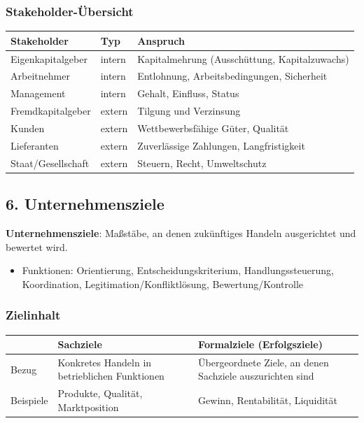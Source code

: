 \documentclass[11pt, a4paper]{article}
\begin{document}
\subsubsection{Stakeholder-Übersicht}


{\small
\begin{tabularx}{\linewidth}{XXX}
\hline
\rowcolor{tableheadbg}
{\color{white}\textbf{Stakeholder}} & {\color{white}\textbf{Typ}} & {\color{white}\textbf{Anspruch}} \\[2pt]
\hline
\endhead
\hline
\endfoot
Eigenkapitalgeber & intern & Kapitalmehrung (Ausschüttung, Kapitalzuwachs) \\
Arbeitnehmer & intern & Entlohnung, Arbeitsbedingungen, Sicherheit \\
Management & intern & Gehalt, Einfluss, Status \\
Fremdkapitalgeber & extern & Tilgung und Verzinsung \\
Kunden & extern & Wettbewerbsfähige Güter, Qualität \\
Lieferanten & extern & Zuverlässige Zahlungen, Langfristigkeit \\
Staat/Gesellschaft & extern & Steuern, Recht, Umweltschutz \\
\end{tabularx}
}



\subsection{6. Unternehmensziele}

\textbf{Unternehmensziele}: Maßstäbe, an denen zukünftiges Handeln ausgerichtet und bewertet wird.

\begin{itemize}
  \item Funktionen: Orientierung, Entscheidungskriterium, Handlungssteuerung, Koordination, Legitimation/Konfliktlösung, Bewertung/Kontrolle
\end{itemize}


\subsubsection{Zielinhalt}


{\small
\begin{tabularx}{\linewidth}{XXX}
\hline
\rowcolor{tableheadbg}
{\color{white}\textbf{}} & {\color{white}\textbf{Sachziele}} & {\color{white}\textbf{Formalziele (Erfolgsziele)}} \\[2pt]
\hline
\endhead
\hline
\endfoot
Bezug & Konkretes Handeln in betrieblichen Funktionen & Übergeordnete Ziele, an denen Sachziele auszurichten sind \\
Beispiele & Produkte, Qualität, Marktposition & Gewinn, Rentabilität, Liquidität \\
\end{tabularx}
}
\end{document}
